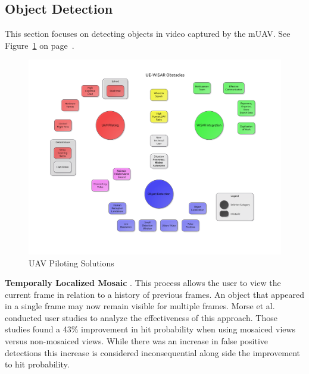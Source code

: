 \subsection{Object Detection}
This section focuses on detecting objects
in video captured by the mUAV.  See Figure~\ref{fig:objectdetectionmap} on page~\pageref{fig:objectdetectionmap}.

\begin{figure}[htp]
	\vspace{-55pt}
	\hspace{-80pt}
	\includegraphics[keepaspectratio=true, width=\paperheight,
	height=\paperheight, page=4, angle=90, scale=0.90,
	trim=20 0 20 0]{obstacle_solution_map.pdf}
	\caption{UAV Piloting Solutions}
	\label{fig:objectdetectionmap}
\end{figure}

\textbf{Temporally Localized Mosaic} \cite{morse2008application,
cluff2009unified}.  This process allows the user to view the current frame in relation to a history of previous frames.  An object that appeared in a
single frame may now remain visible for multiple frames.  Morse et al. conducted
user studies to analyze the effectiveness of this
approach.  Those studies found a 43\% improvement in
hit probability when using mosaiced views versus non-mosaiced views.  While
there was an increase in false positive detections this increase is considered
inconsequential along side the improvement to hit probability.

